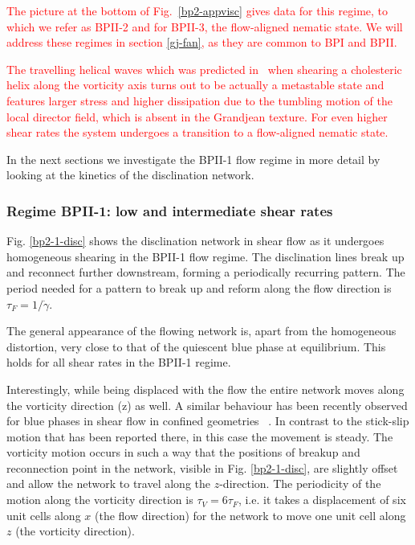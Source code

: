 \documentclass[8.5pt,twoside,twocolumn]{article}
\newcommand{\gd}{\dot{\gamma}}
\newcommand{\rev}[1]{{\textcolor{red}{#1}}}
\begin{document}
\rev{
The picture at the bottom of Fig.~\ref{bp2-appvisc} gives data for this regime, to which we refer as BPII-2 and for BPII-3,
the flow-aligned nematic state. We will address these regimes in section \ref{gj-fan}, as they are common to BPI and BPII.
}

\rev{
The travelling helical waves which was predicted in~\cite{Rey:1996a,Rey:1996b} when shearing a cholesteric helix along
the vorticity axis turns out to be actually a metastable state and features larger stress and higher dissipation due 
to the tumbling motion of the local director field, which is absent in the Grandjean texture.
For even higher shear rates the system undergoes a transition to a flow-aligned nematic state.
}


In the next sections we investigate the BPII-1 flow regime in more detail 
by looking at the kinetics of the disclination network.

\subsubsection{Regime BPII-1: low and intermediate shear rates }

Fig. \ref{bp2-1-disc} shows the disclination network in shear flow as
it undergoes homogeneous shearing in the BPII-1 flow regime. 
The disclination lines break up and 
reconnect further downstream, forming a periodically recurring pattern. The
period needed for a pattern to break up and 
reform along the flow direction is $\tau_F = 1/\gd$.

The general appearance of the flowing network is, apart from the homogeneous distortion,
very close to that of the quiescent blue phase at equilibrium. This holds for all
shear rates in the BPII-1 regime.

Interestingly, while being displaced with the flow the entire network moves 
along the vorticity direction (z) as well.  A similar behaviour has been recently 
observed for blue phases in shear flow in confined geometries ~\cite{Henrich:2012b}.
In contrast to the stick-slip motion that has been reported there,
in this case the movement is steady. 
The vorticity motion occurs in such a way that the positions of breakup and reconnection 
point in the network, visible in Fig. \ref{bp2-1-disc}, are slightly offset and allow the network 
to travel along the $z$-direction. The periodicity of the motion along the vorticity direction
is $\tau_V=6\tau_F$, 
i.e. it takes a displacement of six unit cells along $x$ (the flow direction) 
for the network to move one unit cell along $z$ (the vorticity direction).
\end{document}
